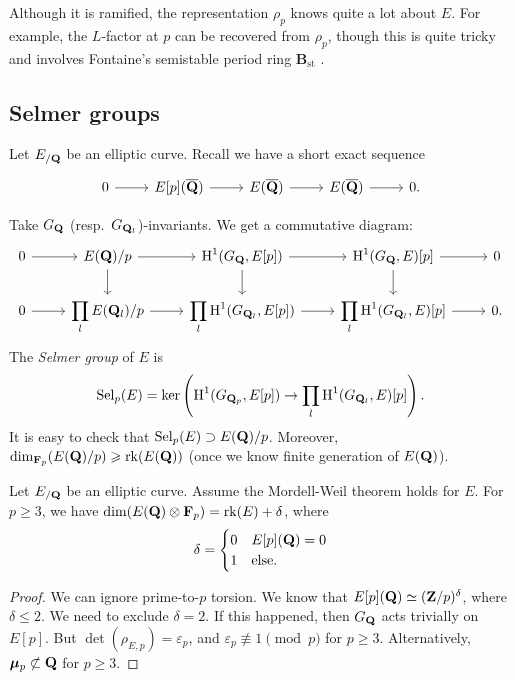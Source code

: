 Although it is ramified, the representation $\rho_p$ knows quite a lot about 
$E$. For example, the $L$-factor at $p$ can be recovered from $\rho_p$, though 
this is quite tricky and involves Fontaine's semistable period ring 
$\mathbf{B}_\mathrm{st}$ \cite{ochiai-1999}. 





\subsection{Selmer groups}

Let $E_{/\mathbf{Q}}$ be an elliptic curve. Recall we have a short exact sequence 
\[\begin{tikzcd}
  0 \ar[r] 
    & E[p](\overline\dQ) \ar[r] 
    & E(\overline\dQ) \ar[r] 
    & E(\overline\dQ) \ar[r] 
    & 0 .
\end{tikzcd}\]

Take $G_{\mathbf{Q}}$ (resp.~$G_{\mathbf{Q}_l}$)-invariants. We get a commutative 
diagram:  
\[\begin{tikzcd}
  0 \ar[r] 
    & E(\dQ)/p \ar[r] \ar[d] 
    & \h^1(G_\dQ,E[p]) \ar[r] \ar[d] 
    & \h^1(G_\dQ,E)[p] \ar[r] \ar[d] 
    & 0 \\ 
  0 \ar[r] 
    & \displaystyle\prod_l E(\dQ_l)/p \ar[r] 
    & \displaystyle\prod_l \h^1(G_{\dQ_l},E[p]) \ar[r] 
    & \displaystyle\prod_l \h^1(G_{\dQ_l},E)[p] \ar[r] 
    & 0 .
\end{tikzcd}\]
The \emph{Selmer group} of $E$ is 
\[
  \operatorname{Sel}_p(E) = \ker\left(\operatorname{H}^1(G_{\mathbf{Q}_p},E[p]) \to \prod_l \operatorname{H}^1(G_{\mathbf{Q}_l},E)[p]\right) .
\]
It is easy to check that $\operatorname{Sel}_p(E)\supset E(\mathbf{Q})/p$. Moreover, 
$\dim_{\mathbf{F}_p}(E(\mathbf{Q})/p) \geqslant \operatorname{rk}(E(\mathbf{Q}))$ (once we know finite 
generation of $E(\mathbf{Q})$). 

\begin{theorem}
Let $E_{/\mathbf{Q}}$ be an elliptic curve. Assume the Mordell-Weil theorem holds for 
$E$. For $p\geqslant 3$, we have $\dim(E(\mathbf{Q})\otimes\mathbf{F}_p) = \operatorname{rk}(E)+\delta$, 
where 
\[
  \delta = \begin{cases} 0 & E[p](\mathbf{Q}) = 0 \\ 1 & \text{else} .\end{cases}
\] 
\end{theorem}
\begin{proof}
We can ignore prime-to-$p$ torsion. We know that 
$E[p](\mathbf{Q})\simeq (\mathbf{Z}/p)^\delta$, where $\delta\leqslant 2$. We need to exclude 
$\delta=2$. If this happened, then $G_{\mathbf{Q}}$ acts trivially on $E[p]$. But 
$\det(\rho_{E,p})=\varepsilon_p$, and $\varepsilon_p\not\equiv 1\pmod p$ for 
$p\geqslant 3$. Alternatively, ${\bm\mu}_p\not\subset \mathbf{Q}$ for $p\geqslant 3$. 
\end{proof}

